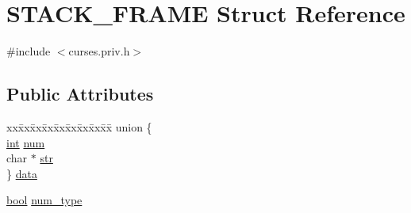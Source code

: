 \hypertarget{struct_s_t_a_c_k___f_r_a_m_e}{\section{S\-T\-A\-C\-K\-\_\-\-F\-R\-A\-M\-E Struct Reference}
\label{struct_s_t_a_c_k___f_r_a_m_e}
}


{\ttfamily \#include $<$curses.\-priv.\-h$>$}

\subsection*{Public Attributes}
\begin{DoxyCompactItemize}
\item 
\begin{tabbing}
xx\=xx\=xx\=xx\=xx\=xx\=xx\=xx\=xx\=\kill
union \{\\
\>\hyperlink{term__entry_8h_ad65b480f8c8270356b45a9890f6499ae}{int} \hyperlink{struct_s_t_a_c_k___f_r_a_m_e_a79dca7c915bee598ae3477e50360f0d9}{num}\\
\>char $\ast$ \hyperlink{struct_s_t_a_c_k___f_r_a_m_e_a45720698c7e0a2653ec1c5a5cdabbb38}{str}\\
\} \hyperlink{struct_s_t_a_c_k___f_r_a_m_e_a7ccc1e7a7e91be58bc243ea95c497778}{data}\\

\end{tabbing}\item 
\hyperlink{term__entry_8h_a002004ba5d663f149f6c38064926abac}{bool} \hyperlink{struct_s_t_a_c_k___f_r_a_m_e_a0e1fa442ad580bbf485cfe9570ca5653}{num\-\_\-type}
\end{DoxyCompactItemize}


